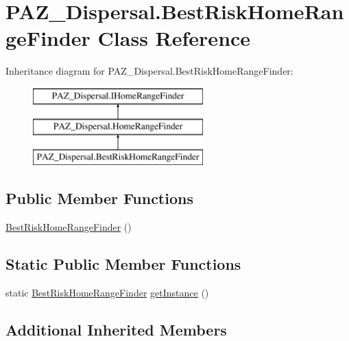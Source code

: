 \hypertarget{class_p_a_z___dispersal_1_1_best_risk_home_range_finder}{\section{P\-A\-Z\-\_\-\-Dispersal.\-Best\-Risk\-Home\-Range\-Finder Class Reference}
\label{class_p_a_z___dispersal_1_1_best_risk_home_range_finder}
}


 


Inheritance diagram for P\-A\-Z\-\_\-\-Dispersal.\-Best\-Risk\-Home\-Range\-Finder\-:\begin{figure}[H]
\begin{center}
\leavevmode
\includegraphics[height=3.000000cm]{class_p_a_z___dispersal_1_1_best_risk_home_range_finder}
\end{center}
\end{figure}
\subsection*{Public Member Functions}
\begin{DoxyCompactItemize}
\item 
\hyperlink{class_p_a_z___dispersal_1_1_best_risk_home_range_finder_ae7ee9a720be67263963a21e3293291f3}{Best\-Risk\-Home\-Range\-Finder} ()
\end{DoxyCompactItemize}
\subsection*{Static Public Member Functions}
\begin{DoxyCompactItemize}
\item 
static \hyperlink{class_p_a_z___dispersal_1_1_best_risk_home_range_finder}{Best\-Risk\-Home\-Range\-Finder} \hyperlink{class_p_a_z___dispersal_1_1_best_risk_home_range_finder_a1ad01ccf12e65af62c07717fdf1408c8}{get\-Instance} ()
\end{DoxyCompactItemize}
\subsection*{Additional Inherited Members}


